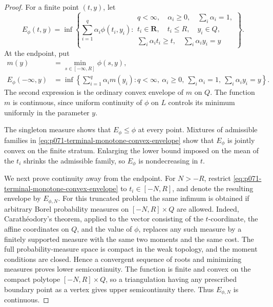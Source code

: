 \begin{proof}
For a finite point \((t,y)\), let
\begin{equation}
 E_\phi(t,y)=
 \inf\left\{
   \sum_{i=1}^q\alpha_i\phi(t_i,y_i):
   \begin{array}{l}
    q<\infty,\quad \alpha_i\geq0,\quad \sum_i\alpha_i=1,\\
    t_i\in\mathbf R,\quad t_i\leq R,\quad y_i\in Q,\\
    \sum_i\alpha_i t_i\geq t,\quad
    \sum_i\alpha_i y_i=y
   \end{array}\right\}.
 \label{eq:p071-terminal-monotone-convex-envelope}
\end{equation}
At the endpoint, put
\begin{align}
 m(y)&=\min_{s\in[-\infty,R]}\phi(s,y),\\
 E_\phi(-\infty,y)
   &=\inf\left\{\sum_{i=1}^q\alpha_i m(y_i):
       q<\infty,\ \alpha_i\geq0,\ \sum_i\alpha_i=1,\
       \sum_i\alpha_i y_i=y\right\}.
 \label{eq:p071-terminal-endpoint-envelope}
\end{align}
The second expression is the ordinary convex envelope of \(m\) on \(Q\).
The function \(m\) is continuous, since uniform continuity of \(\phi\) on
\(L\) controls its minimum uniformly in the parameter \(y\).

The singleton measure shows that \(E_\phi\leq\phi\) at every point.  Mixtures
of admissible families in
\eqref{eq:p071-terminal-monotone-convex-envelope} show that \(E_\phi\) is
jointly convex on the finite stratum.  Enlarging the lower bound imposed on
the mean of the \(t_i\) shrinks the admissible family, so \(E_\phi\) is
nondecreasing in \(t\).

We next prove continuity away from the endpoint.  For \(N>-R\), restrict
\eqref{eq:p071-terminal-monotone-convex-envelope} to
\(t_i\in[-N,R]\), and denote the resulting envelope by \(E_{\phi,N}\).
For this truncated problem the same infimum is obtained if arbitrary Borel
probability measures on \([-N,R]\times Q\) are allowed.  Indeed,
Carath\'eodory's theorem, applied to the vector consisting of the
\(t\)-coordinate, the affine coordinates on \(Q\), and the value of \(\phi\),
replaces any such measure by a finitely supported measure with the same two
moments and the same cost.  The full probability-measure space is compact in
the weak topology, and the moment conditions are closed.  Hence a convergent
sequence of roots and minimizing measures proves lower semicontinuity.  The
function is finite and convex on the compact polytope \([-N,R]\times Q\), so
a triangulation having any prescribed boundary point as a vertex gives upper
semicontinuity there.  Thus \(E_{\phi,N}\) is continuous.


\end{proof}
